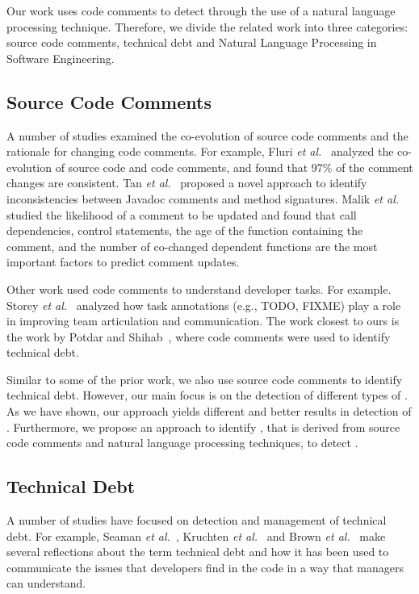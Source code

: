 Our work uses code comments to detect \SATD through the use of a natural language processing technique. Therefore, we divide the related work into three categories: source code comments, technical debt and Natural Language Processing in Software Engineering.

\subsection{Source Code Comments}

A number of studies examined the co-evolution of source code comments and the rationale for changing code comments. For example, Fluri \textit{et al.}~\cite{Fluri2007WCRE} analyzed the co-evolution of source code and code comments, and found that 97\% of the comment changes are consistent. Tan \textit{et al.}~\cite{Tan2012ICST} proposed a novel approach to identify inconsistencies between Javadoc comments and method signatures. Malik \textit{et al.} \cite{Malik2008ICSM} studied the likelihood of a comment to be updated and found that call dependencies, control statements, the age of the function containing the comment, and the number of co-changed dependent functions are the most important factors to predict comment updates.

Other work used code comments to understand developer tasks. For example. Storey \textit{et al.}~\cite{Storey2008ICSE} analyzed how task annotations (e.g., TODO, FIXME) play a role in improving team articulation and communication. The work closest to ours is the work by Potdar and Shihab~\cite{Potdar2014ICSME}, where code comments were used to identify technical debt. 

Similar to some of the prior work, we also use source code comments to identify technical debt. However, our main focus is on the detection of different types of \SATD. As we have shown, our approach yields different and better results in detection of \SATD. Furthermore, we propose an approach to identify \SATD, that is derived from source code comments and natural language processing techniques, to detect \SATD.

\subsection{Technical Debt}

A number of studies have focused on detection and management of technical debt. For example, Seaman \textit{et al.}~\cite{Seaman2011}, Kruchten \textit{et al.}~\cite{Kruchten2013IWMTD} and Brown \textit{et al.}~\cite{Brown2010MTD} make several reflections about the term technical debt and how it has been used to communicate the issues that developers find in the code in a way that managers can understand. 


